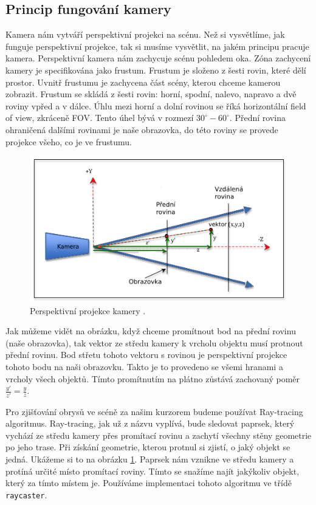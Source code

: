 \documentclass[czech,bachelor,dept420,male,cpdeclaration]{diploma}
\begin{document}

\subsection{Princip fungování kamery}\label{secref:secref16}
Kamera nám vytváří perspektivní projekci na scénu. Než si vysvětlíme, jak funguje perspektivní projekce, tak si musíme vysvětlit, na jakém principu pracuje kamera. Perspektivní kamera nám zachycuje scénu pohledem oka. Zóna zachycení kamery je specifikována jako frustum. Frustum je složeno z šesti rovin, které dělí prostor. Uvnitř frustumu je zachycena část scény, kterou chceme kamerou zobrazit. Frustum se skládá z šesti rovin: horní, spodní, nalevo, napravo a dvě roviny vpřed a v dálce. Úhlu mezi horní a dolní rovinou se říká horizontální field of view, zkráceně FOV. Tento úhel bývá v rozmezí $30^\circ-60^\circ$. Přední rovina ohraničená dalšími rovinami je naše obrazovka, do této roviny se provede projekce všeho, co je ve frustumu. 

\begin{figure}[H]
\centering
\includegraphics[width=\linewidth]{Figures/perspectiveProjection.png}
\caption{Perspektivní projekce kamery \cite{learnwebgl}. }
\label{fig:perspectiveProjection}
\end{figure} 

Jak můžeme vidět na obrázku, když chceme promítnout bod na přední rovinu (naše obrazovka), tak vektor ze středu kamery k vrcholu objektu musí protnout přední rovinu. Bod střetu tohoto vektoru s rovinou je perspektivní projekce tohoto bodu na naši obrazovku. Takto je to provedeno se všemi hranami a vrcholy všech objektů. Tímto promítnutím na plátno zůstává zachovaný poměr $\frac{y'}{z'}=\frac{y}{z}$. 


Pro zjišťování obrysů ve scéně za našim kurzorem budeme používat Ray-tracing algoritmus. Ray-tracing, jak už z názvu vyplívá, bude sledovat paprsek, který vychází ze středu kamery přes promítací rovinu a zachytí všechny stěny geometrie po jeho trase. Při získání geometrie, kterou protnul si zjistí, o jaký objekt se jedná. Ukážeme si to na obrázku \ref{fig:perspectiveProjection}. Paprsek nám vznikne ve středu kamery a protíná určité místo promítací roviny. Tímto se snažíme najít jakýkoliv objekt, který za tímto místem je. Používáme implementaci tohoto algoritmu ve třídě \texttt{raycaster}.
\end{document}
